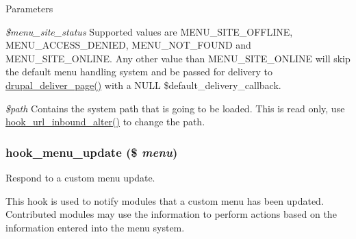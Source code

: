 \begin{DoxyParams}{Parameters}
\item[{\em \$menu\_\-site\_\-status}]Supported values are MENU\_\-SITE\_\-OFFLINE, MENU\_\-ACCESS\_\-DENIED, MENU\_\-NOT\_\-FOUND and MENU\_\-SITE\_\-ONLINE. Any other value than MENU\_\-SITE\_\-ONLINE will skip the default menu handling system and be passed for delivery to \hyperlink{common_8inc_a1537b4ccc064fb7d8106effcac8caac3}{drupal\_\-deliver\_\-page()} with a NULL \$default\_\-delivery\_\-callback. \item[{\em \$path}]Contains the system path that is going to be loaded. This is read only, use \hyperlink{group__hooks_ga32da9c3f1486c293818f30fa4037e33f}{hook\_\-url\_\-inbound\_\-alter()} to change the path. \end{DoxyParams}
\hypertarget{group__hooks_ga21331911abfc25de5921af04a76a0921}{
\subsubsection[{hook\_\-menu\_\-update}]{\setlength{\rightskip}{0pt plus 5cm}hook\_\-menu\_\-update (\$ {\em menu})}}
\label{group__hooks_ga21331911abfc25de5921af04a76a0921}
Respond to a custom menu update.

This hook is used to notify modules that a custom menu has been updated. Contributed modules may use the information to perform actions based on the information entered into the menu system.


